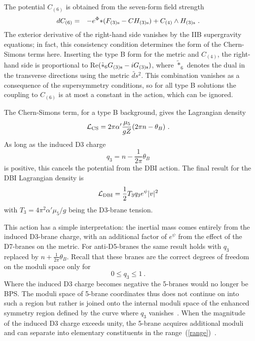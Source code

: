 \documentclass[a4paper,12pt]{article}
\renewcommand{\=}[1]{\bar{#1}}
\begin{document}
The potential $C_{(6)}$ is obtained from the seven-form field
strength
\begin{eqnarray}
dC_{(6)} &=& - e^{\Phi}
  {*} ( F_{(3)\rm s} - C H_{(3)\rm s})
+ C_{(4)} \wedge H_{(3)\rm s} \ .
\label{C6}
\end{eqnarray}
The exterior derivative of the right-hand side vanishes by the IIB
supergravity equations; in fact, this consistency condition determines the
form of the Chern-Simons terms here.  Inserting the type B form
for the metric and $C_{(4)}$, the right-hand side is proportional to
Re$(\tilde{*}_6 G_{(3)\rm s} - i G_{(3)\rm s})$, where $\tilde{*}_6$ denotes
the dual in the transverse directions using the metric
$\widetilde{ds}{}^2$.  This combination vanishes as a consequence of the
supersymmetry conditions, so for all type B solutions the coupling to $C_{(6)}$ is
at most a constant in the action, which can be ignored.

The Chern-Simons term, for a type B background, gives the Lagrangian
density
\begin{equation}
{\cal L}_{\rm CS} = 2\pi \alpha' \frac{\mu_5}{gZ} ( 2\pi n - \theta_B
)\ .
\end{equation}
As long as the induced D3 charge
\begin{equation}
q_3 = n - \frac{1}{2\pi} \theta_B
\label{q3}
\end{equation}
is positive, this cancels the potential from the DBI action. The final result 
for the DBI Lagrangian density is
\begin{equation}
{\cal L}_{\rm DBI} = \frac{1}{2} T_3 q_3 e^{\psi} {|v|^2}
\end{equation}
with $T_3 = 4\pi^2 \alpha' \mu_5 / g$ being the D3-brane tension.

This action has a
simple interpretation: the inertial mass
comes entirely from the induced D3-brane charge, with an additional factor of
$e^\psi$ from the effect of the D7-branes on the metric.  For anti-D5-branes
the same result holds with $q_3$ replaced by $n + \frac{1}{2\pi}
\theta_B$.  Recall that these branes are the correct degrees of
freedom on the moduli space only for
\begin{equation}
0 \leq q_3 \leq 1\ . \label{range}
\end{equation}
Where the induced
D3 charge becomes negative the 5-branes would no longer be BPS.  The moduli
space of 5-brane coordinates thus does not continue on into such a region but
rather is joined onto the internal moduli space of the enhanced symmetry
region defined by the curve where $q_3$ vanishes~\cite{enhan}.
When the magnitude of the induced D3 charge exceeds unity, the 5-brane
acquires additional moduli and can separate into elementary constituents in
the range~(\ref{range})~\cite{n2me}.
\end{document}
